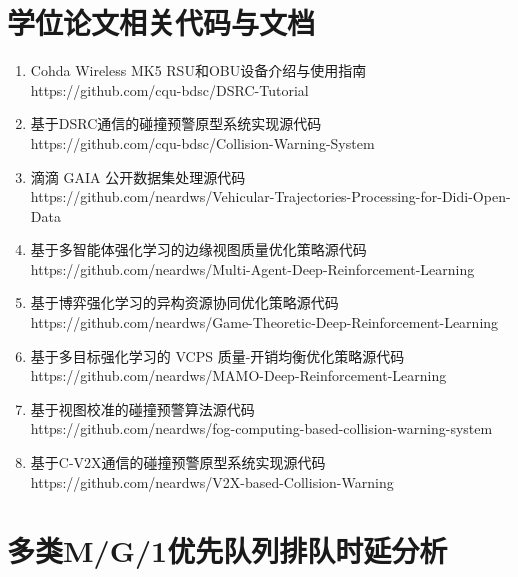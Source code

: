 \section{学位论文相关代码与文档}
\begin{enumerate}
	\item Cohda Wireless MK5 RSU和OBU设备介绍与使用指南\\https://github.com/cqu-bdsc/DSRC-Tutorial
	\item 基于DSRC通信的碰撞预警原型系统实现源代码\\https://github.com/cqu-bdsc/Collision-Warning-System
	\item 滴滴 GAIA 公开数据集处理源代码\\https://github.com/neardws/Vehicular-Trajectories-Processing-for-Didi-Open-Data
	\item 基于多智能体强化学习的边缘视图质量优化策略源代码\\https://github.com/neardws/Multi-Agent-Deep-Reinforcement-Learning
	\item 基于博弈强化学习的异构资源协同优化策略源代码\\https://github.com/neardws/Game-Theoretic-Deep-Reinforcement-Learning
	\item 基于多目标强化学习的 VCPS 质量-开销均衡优化策略源代码\\https://github.com/neardws/MAMO-Deep-Reinforcement-Learning
	\item 基于视图校准的碰撞预警算法源代码\\https://github.com/neardws/fog-computing-based-collision-warning-system
	\item 基于C-V2X通信的碰撞预警原型系统实现源代码\\https://github.com/neardws/V2X-based-Collision-Warning
\end{enumerate}

\section{多类M/G/1优先队列排队时延分析}\label{appendix e}

